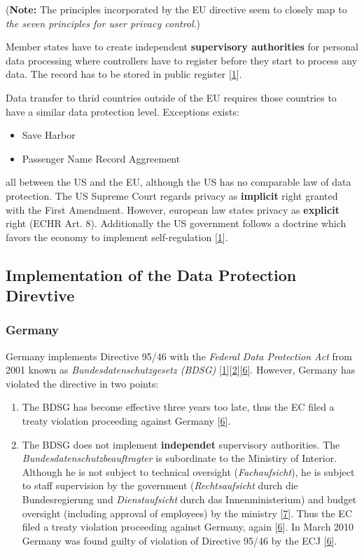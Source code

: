 (\textbf{Note:} The principles incorporated by the EU directive seem to closely map to \emph{the seven principles for user privacy control}.)

Member states have to create independent \textbf{supervisory authorities} for personal data processing where controllers have to register before they start to process any data.
The record has to be stored in public register {[}\hyperref[references]{1}{]}.

Data transfer to thrid countries outside of the EU requires those countries to have a similar data protection level. Exceptions exists:

\begin{itemize}
\item
  Save Harbor
\item
  Passenger Name Record Aggreement
\end{itemize}

all between the US and the EU, although the US has no comparable law of data protection. 
The US Supreme Court regards privacy as \textbf{implicit} right granted with the First Amendment. However, european law states privacy as \textbf{explicit} right (ECHR Art. 8).
Additionally the US government follows a doctrine which favors the economy to implement self-regulation {[}\hyperref[references]{1}{]}.

\subsection{Implementation of the Data Protection Direvtive}

\subsubsection*{Germany}

Germany implements Directive 95/46 with the \emph{Federal Data Protection Act} from 2001 known as \emph{Bundesdatenschutzgesetz (BDSG)} {[}\hyperref[references]{1}{]}{[}\hyperref[references]{2}{]}{[}\hyperref[references]{6}{]}.
However, Germany has violated the directive in two points:

\begin{enumerate}
\item
The BDSG has become effective three years too late, thus the EC filed a treaty violation proceeding against Germany {[}\hyperref[references]{6}{]}.

\item
The BDSG does not implement \textbf{independet} supervisory authorities. 
The \emph{Bundesdatenschutzbeauftragter} is subordinate to the Ministiry of Interior. 
Although he is not subject to technical oversight (\emph{Fachaufsicht}), he is subject to staff supervision by the government (\emph{Rechtsaufsicht} durch die Bundesregierung und  \emph{Dienstaufsicht} durch das Innenministerium) and budget oversight (including approval of employees) by the ministry {[}\hyperref[references]{7}{]}. 
Thus the EC filed a treaty violation proceeding against Germany, again {[}\hyperref[references]{6}{]}. 
In March 2010 Germany was found guilty of violation of Directive 95/46 by the ECJ {[}\hyperref[references]{6}{]}.
\end{enumerate}

